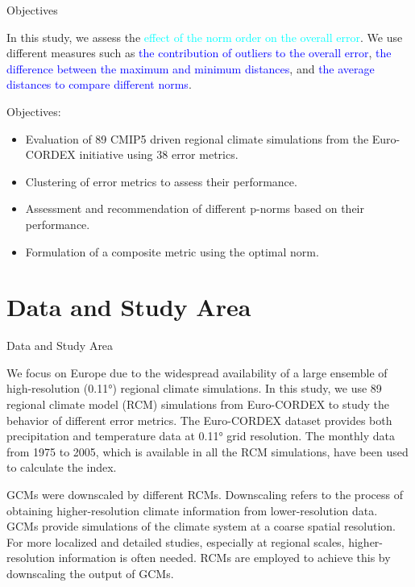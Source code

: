 \documentclass[xcolor={dvipsnames}]{beamer}
\begin{document}
\begin{frame}{Objectives}

In this study, we assess the \textcolor{cyan}{effect of the norm order on the overall error}. We use different measures such as \textcolor{blue}{the contribution of outliers to the overall error}, \textcolor{blue}{the difference between the maximum and minimum distances}, and \textcolor{blue}{the average distances to compare different norms}.

\hfill

\pause

Objectives:
\begin{itemize}
    \item<1-> Evaluation of 89 CMIP5 driven regional climate simulations from the Euro-CORDEX initiative using 38 error metrics.
    \item<3-> Clustering of error metrics to assess their performance.
    \item<4-> Assessment and recommendation of different p-norms based on their performance.
    \item<5> Formulation of a composite metric using the optimal norm.
\end{itemize}
    
\end{frame}

\section{Data and Study Area}


\begin{frame}{Data and Study Area}

We focus on Europe due to the widespread availability of a large ensemble of high-resolution (0.11°) regional climate simulations. In this study, we use 89 regional climate model (RCM) simulations from Euro-CORDEX to study the behavior of different error metrics. The Euro-CORDEX dataset provides both precipitation and temperature data at 0.11° grid resolution. The monthly data from 1975 to 2005, which is available in all the RCM simulations, have been used to calculate the index.

\pause

\hfill

GCMs were downscaled by different RCMs. Downscaling refers to the process of obtaining higher-resolution climate information from lower-resolution data. GCMs provide simulations of the climate system at a coarse spatial resolution. For more localized and detailed studies, especially at regional scales, higher-resolution information is often needed. RCMs are employed to achieve this by downscaling the output of GCMs.
    
\end{frame}
\end{document}

